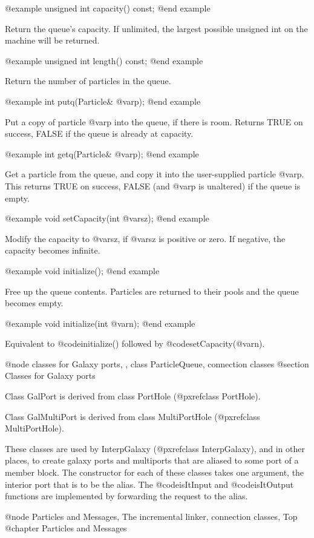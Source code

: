 @example
unsigned int capacity() const;
@end example

Return the queue's capacity.  If unlimited, the largest possible
unsigned int on the machine will be returned.

@example
unsigned int length() const;
@end example

Return the number of particles in the queue.

@example
int putq(Particle& @var{p});
@end example

Put a copy of particle @var{p} into the queue, if there is room.
Returns TRUE on success, FALSE if the queue is already at capacity.

@example
int getq(Particle& @var{p});
@end example

Get a particle from the queue, and copy it into the user-supplied
particle @var{p}.  This returns TRUE on success, FALSE (and @var{p}
is unaltered) if the queue is empty.

@example
void setCapacity(int @var{sz});
@end example

Modify the capacity to @var{sz}, if @var{sz} is positive or zero.  If
negative, the capacity becomes infinite.

@example
void initialize();
@end example

Free up the queue contents.  Particles are returned to their pools and
the queue becomes empty.

@example
void initialize(int @var{n});
@end example

Equivalent to @code{initialize()} followed by @code{setCapacity(@var{n})}.

@node classes for Galaxy ports,  , class ParticleQueue, connection classes
@section Classes for Galaxy ports

Class GalPort is derived from class PortHole (@pxref{class PortHole}).

Class GalMultiPort is derived from class MultiPortHole
(@pxref{class MultiPortHole}).

These classes are used by InterpGalaxy (@pxref{class InterpGalaxy}),
and in other places, to create
galaxy ports and multiports that are aliased to some port of a member
block.  The constructor for each of these classes takes one argument,
the interior port that is to be the alias.  The @code{isItInput} and
@code{isItOutput} functions are implemented by forwarding the request
to the alias.

@node Particles and Messages, The incremental linker, connection classes, Top
@chapter Particles and Messages

